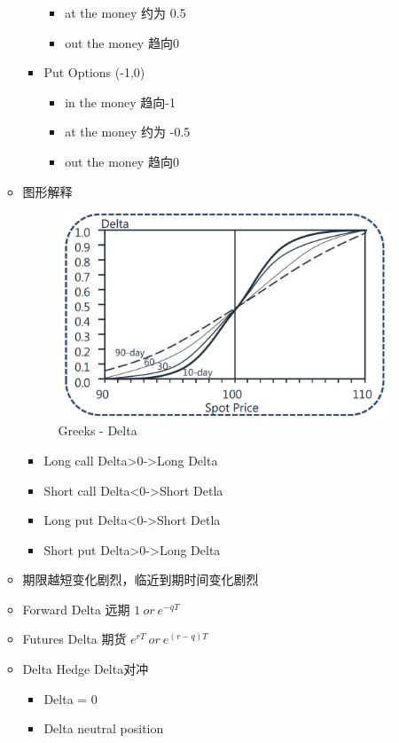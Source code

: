\documentclass[a4paper,6pt,twoside,openany]{article}
\begin{document}
\begin{itemize}
\begin{itemize}
\begin{itemize}
\begin{itemize}
      \item at the money 约为 0.5
      \item out the money 趋向0
      \end{itemize}
    \item Put Options (-1,0)
      \begin{itemize}
      \item in the money 趋向-1
      \item at the money 约为 -0.5
      \item out the money 趋向0
      \end{itemize}
    \end{itemize}
  \item 图形解释
     \begin{figure}[ht!]
      \centering \includegraphics[width=100mm]{Greeks_Delta.jpg}
      \caption{Greeks - Delta}
    \end{figure}
    \begin{itemize}
    \item Long call Delta>0->Long Delta
    \item Short call Delta<0->Short Detla
    \item Long put Delta<0->Short Detla
    \item Short put Delta>0->Long Delta
    \end{itemize}
  \item 期限越短变化剧烈，临近到期时间变化剧烈
  \item Forward Delta 远期 $1 \ or\ e^{-qT}$
  \item Futures Delta 期货 $e^{rT} \ or\ e^{(r - q)T}$
  \item Delta Hedge Delta对冲
    \begin{itemize}
    \item Delta = 0
    \item Delta neutral position
    \end{itemize}
  \end{itemize}
  

\end{itemize}
\end{document}
